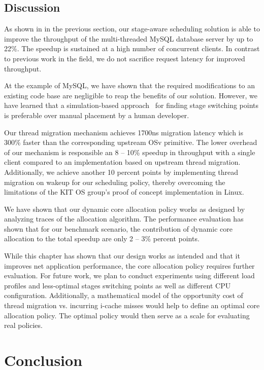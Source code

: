 \documentclass[12pt,a4paper]{book}
\begin{document}
\clearpage
\section{Discussion}\label{ch:eval:discussion}
As shown in in the previous section, our stage-aware scheduling solution is able to improve the throughput of the multi-threaded MySQL database server by up to 22\%.
The speedup is sustained at a high number of concurrent clients.
In contrast to previous work in the field, we do not sacrifice request latency for improved throughput.

At the example of MySQL, we have shown that the required modifications to an existing code base are negligible to reap the benefits of our solution.
However, we have learned that a simulation-based approach~\cite{kitOSSFMA} for finding stage switching points is preferable over manual placement by a human developer.

Our thread migration mechanism achieves 1700ns migration latency which is 300\% faster than the corresponding upstream OSv primitive.
The lower overhead of our mechanism is responsible an 8 -- 10\% speedup in throughput with a single client compared to an implementation based on upstream thread migration.
Additionally, we achieve another 10 percent points by implementing thread migration on wakeup for our scheduling policy, thereby overcoming the limitations of the KIT OS group's proof of concept implementation in Linux.

We have shown that our dynamic core allocation policy works as designed by analyzing traces of the allocation algorithm.
The performance evaluation has shown that for our benchmark scenario, the contribution of dynamic core allocation to the total speedup are only 2 -- 3\% percent points.

While this chapter has shown that our design works as intended and that it improves net application performance, the core allocation policy requires further evaluation.
For future work, we plan to conduct experiments using different load profiles and less-optimal stages switching points as well as different CPU configuration.
Additionally, a mathematical model of the opportunity cost of thread migration vs. incurring i-cache misses would help to define an optimal core allocation policy.
The optimal policy would then serve as a scale for evaluating real policies.

\chapter{Conclusion}\label{ch:concl}
\end{document}
